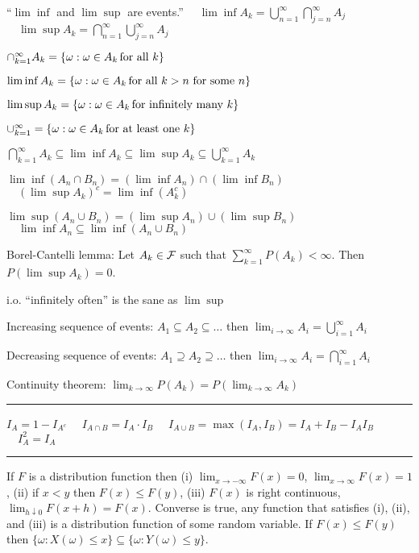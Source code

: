 \documentclass[10pt]{article}
\begin{document}
\begin{plain}
\smallskip
``$\lim\inf$ and $\lim\sup$ are events.''
$\quad\displaystyle\lim\inf A_k
=\bigcup_{n=1}^\infty\bigcap_{j=n}^\infty A_j$
$\quad\displaystyle\lim\sup A_k
=\bigcap_{n=1}^\infty\bigcup_{j=n}^\infty A_j$

\smallskip
$\cap_{k=1}^\infty A_k=\{\omega:\omega\in A_k\,
\hbox{for all $k$}\}$

$\lim\inf A_k=\{\omega:\omega\in A_k\,
\hbox{for all $k>n$ for some $n$}\}$

$\lim\sup A_k=\{\omega:\omega\in A_k\,
\hbox{for infinitely many $k$}\}$

$\cup_{k=1}^\infty=\{\omega:\omega\in A_k\,
\hbox{for at least one $k$}\}$

\smallskip
\centerline{
$\displaystyle
\bigcap_{k=1}^\infty A_k
\subseteq
\lim\inf A_k
\subseteq
\lim\sup A_k
\subseteq
\bigcup_{k=1}^\infty A_k
$}

\smallskip
$\lim\inf(A_n\cap B_n)=(\lim\inf A_n)\cap(\lim\inf B_n)$
$\quad(\lim\sup A_k)^c=\lim\inf(A_k^c)$

$\lim\sup(A_n\cup B_n)=(\lim\sup A_n)\cup(\lim\sup B_n)$
$\quad\lim\inf A_n\subseteq\lim\inf(A_n\cup B_n)$

\smallskip
Borel-Cantelli lemma:
Let $A_k\in\cal F$ such that
$\displaystyle\sum_{k=1}^\infty P(A_k)<\infty$.
Then $P(\lim\sup A_k)=0$.

\smallskip
i.o. ``infinitely often'' is the sane as $\lim\sup$

\smallskip
Increasing sequence of events:
$A_1\subseteq A_2\subseteq\ldots$ then
$\displaystyle\lim_{i\to\infty}A_i=\bigcup_{i=1}^\infty A_i$

\smallskip
Decreasing sequence of events:
$A_1\supseteq A_2\supseteq\ldots$ then
$\displaystyle\lim_{i\to\infty}A_i=\bigcap_{i=1}^\infty A_i$

\smallskip
Continuity theorem:
$\lim_{k\to\infty}P(A_k)=P(\lim_{k\to\infty}A_k)$

\smallskip
\hrule

\smallskip
$I_A=1-I_{A^c}$
$\quad I_{A\cap B}=I_A\cdot I_B$
$\quad I_{A\cup B}=\max(I_A,I_B)=I_A+I_B-I_AI_B$
$\quad I_A^2=I_A$

\smallskip
\hrule

\smallskip
If $F$ is a distribution function then
(i) $\lim_{x\to-\infty}F(x)=0$,
$\lim_{x\to\infty}F(x)=1$,
(ii) if $x<y$ then $F(x)\le F(y)$,
(iii) $F(x)$ is right continuous,
$\lim_{h\downarrow0}F(x+h)=F(x)$.
Converse is true, any function that satisfies (i), (ii), and (iii)
is a distribution function of some random variable.
If $F(x)\le F(y)$ then $\{\omega:X(\omega)\le x\}
\subseteq\{\omega:Y(\omega)\le y\}$.


\end{plain}
\end{document}
